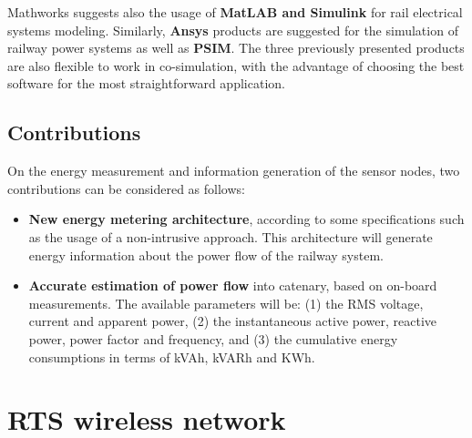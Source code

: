 Mathworks suggests also the usage of \textbf{MatLAB and Simulink} for rail electrical systems modeling. 
Similarly, \textbf{Ansys} products are suggested for the simulation of railway power systems as well as \textbf{PSIM}. The three previously presented products are also flexible to work in co-simulation, with the advantage of choosing the best software for the most straightforward application.


	\subsection{Contributions}
	
	On the energy measurement and information generation of the sensor nodes, two contributions can be considered as follows:
	
	\begin{itemize}
		\setlength\itemsep{0em}
		
		\item \textbf{New energy metering architecture}, according to some specifications such as the usage of a non-intrusive approach.
		This architecture will generate energy information about the power flow of the railway system.
		
		\item \textbf{Accurate estimation of power flow} into catenary, based on on-board measurements. The available parameters will be: (1) the RMS voltage, current and apparent power, (2) the instantaneous active power, reactive power, power factor and frequency, and (3) the cumulative energy consumptions in terms of kVAh, kVARh and KWh.
		
		
	\end{itemize}

%		
%		
	

\section{\ac{RTS} wireless network}
\label{sec:43}

